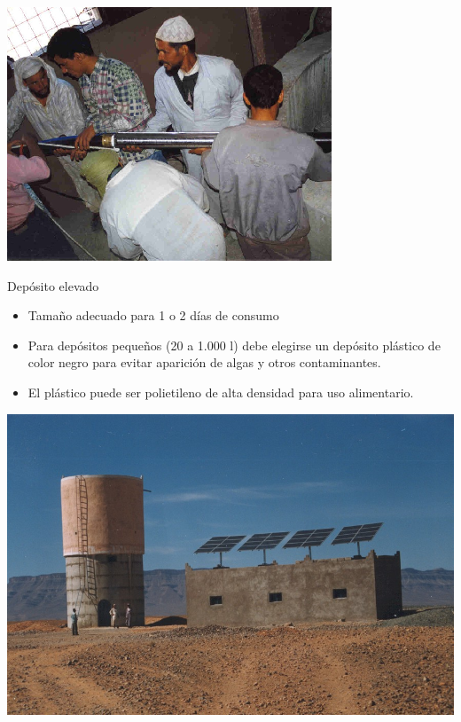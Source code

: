 \documentclass[xcolor={usenames,svgnames,dvipsnames}]{beamer}
\begin{document}
\begin{frame}[label=sec-4-0-4]{}
\includegraphics[width=.9\linewidth]{../figs/Marruecos4.png}
\end{frame}


\begin{frame}[label=sec-4-0-5]{Depósito elevado}
\begin{itemize}
\item \alert{Tamaño adecuado para 1 o 2 días de consumo}
\item Para depósitos pequeños (20 a 1.000 l) debe elegirse un \alert{depósito plástico de color negro}  para evitar aparición de algas y otros contaminantes.
\item El plástico puede ser polietileno de alta densidad para uso alimentario.
\end{itemize}
\end{frame}

\begin{frame}[label=sec-4-0-6]{}
\includegraphics[width=.9\linewidth]{../figs/Bombeo.jpg}
\end{frame}
\end{document}
